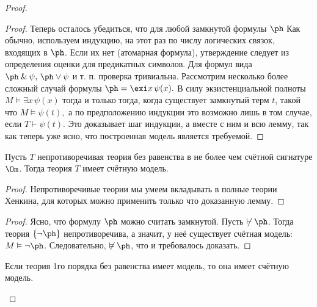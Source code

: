 \documentclass[a4paper,draft]{article}
\let\amper\&
\def\&{\mathbin{\amper}}
\def\exis#1{\exi#1\,}
\DeclareMathOperator{\PC}{PC}
\begin{document}
\begin{proof}
\begin{proof}
Теперь осталось убедиться, что для любой замкнутой формулы $\ph$
Как обычно, используем индукцию, на этот раз по числу логических связок, входящих в $\ph$.
Если их нет (атомарная формула), утверждение следует из определения оценки для предикатных символов.
Для формул вида $\ph\&\psi,\,\ph\vee\psi$ и т. п. проверка тривиальна. Рассмотрим несколько более сложный
случай формулы $\ph=\exis x\psi(x).$ В силу экзистенциальной полноты $M\vDash\exis x\psi(x)$ тогда и только тогда,
когда существует замкнутый терм $t$, такой что $M\vDash\psi(t),$ а по предположению индукции это возможно лишь
в том случае, если $T\vdash\psi(t).$ Это доказывает шаг индукции, а вместе с ним и всю лемму, так как теперь
уже ясно, что построенная модель является требуемой.
\end{proof}
\begin{theorem}
Пусть $T$ непротиворечивая теория без равенства в не более чем счётной
сигнатуре $\Om$. Тогда теория $T$ имеет счётную модель.
\end{theorem}
\begin{proof}
Непротиворечивые теории мы умеем вкладывать в полные теории Хенкина, для которых можно применить только что доказанную лемму.
\end{proof}
\begin{theorem}
\equ{\vDash\ph\Ra\vdash_{\PC_{\Om}}\ph.}
\end{theorem}
\begin{proof}
Ясно, что формулу $\ph$ можно считать замкнутой. Пусть $\not\vdash\ph$. Тогда теория
$\{\neg\ph\}$ непротиворечива, а значит, у неё существует счётная модель: $M\vDash\neg\ph$.
Следовательно, $\not\vDash\ph$, что и требовалось доказать.
\end{proof}
\begin{imp}
Если теория 1го порядка без равенства имеет модель, то она имеет счётную модель.
\end{imp}

\end{proof}
\end{document}
